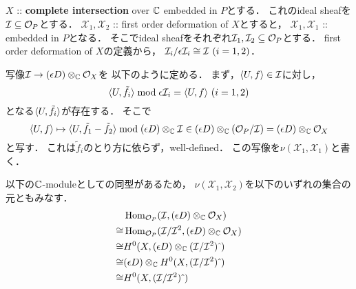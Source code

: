 \documentclass[a4paper]{jsarticle}
\newcommand{\defX}{\mathcal{X}}
\begin{document}
    \subsection{\tp{$\nu(\defX_1, \defX_2)$}{v(X1,X2)}}
    \begin{Def}
        $X$ :: \textbf{complete intersection} over $\mathbb{C}$ embedded in $P$とする．
        これのideal sheafを$\mathcal{I} \subseteq \mathcal{O}_P$とする．
        $\defX_1, \defX_2$ :: first order deformation of $X$とすると，
        $\defX_1, \defX_1$ :: embedded in $P$となる．
        そこでideal sheafをそれぞれ$\mathcal{I}_1, \mathcal{I}_2 \subseteq \mathcal{O}_P$とする．
        first order deformation of $X$の定義から，
        $\shI_i/\epsilon \shI_i \iso \shI \ (i=1,2)$．

        写像$\mathcal{I} \to (\epsilon D) \otimes_{\mathbb{C}} \mathcal{O}_X$を
        以下のように定める．
        まず，$\langle U,f \rangle \in \mathcal{I}$に対し，
        \[ \langle U,\tilde{f}_i \rangle \bmod \epsilon \mathcal{I}_i=\langle U,f \rangle \ (i=1,2) \]
        となる$\langle U,\tilde{f}_i \rangle$が存在する．
        そこで
        \[
            \langle U,f \rangle
            \mapsto
            \langle U,\tilde{f}_1-\tilde{f}_2 \rangle \bmod (\epsilon D) \otimes_{\mathbb{C}} \mathcal{I}
            \in (\epsilon D) \otimes_{\mathbb{C}} (\mathcal{O}_P/\mathcal{I})=(\epsilon D) \otimes_{\mathbb{C}} \mathcal{O}_X
        \]
        と写す．
        これは$\tilde{f}_i$のとり方に依らず，well-defined．
        この写像を$\nu(\defX_1, \defX_1)$と書く．

        以下の$\mathbb{C}$-moduleとしての同型があるため，
        $\nu(\defX_1, \defX_2)$を以下のいずれの集合の元ともみなす．
        \begin{align*}
            {}&   \operatorname{Hom}_{\mathcal{O}_P}(\mathcal{I}, (\epsilon D) \otimes_{\mathbb{C}} \mathcal{O}_X) \\
            \cong& \operatorname{Hom}_{\mathcal{O}_P}(\mathcal{I}/\mathcal{I}^2, (\epsilon D) \otimes_{\mathbb{C}} \mathcal{O}_X) \\
            \cong& H^0(X, (\epsilon D) \otimes_{\mathbb{C}} (\mathcal{I}/\mathcal{I}^2)\,\hat{}\,) \\
            \cong& (\epsilon D) \otimes_{\mathbb{C}} H^0(X, (\mathcal{I}/\mathcal{I}^2)\,\hat{}\,) \\
            \cong& H^0(X, (\mathcal{I}/\mathcal{I}^2)\,\hat{}\,)
        \end{align*}
    \end{Def}
\end{document}
